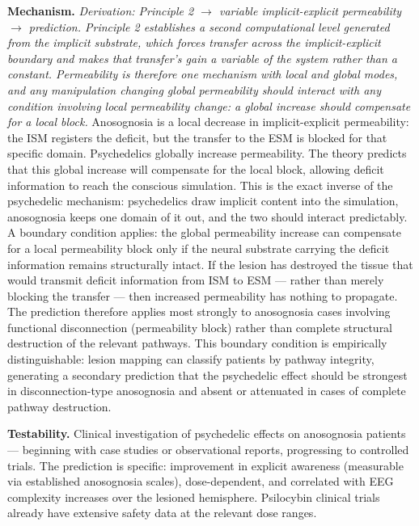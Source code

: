 \documentclass[12pt]{article}
\begin{document}
\textbf{Mechanism.} \emph{Derivation: Principle 2 $\rightarrow$ variable implicit-explicit permeability $\rightarrow$ prediction. Principle 2 establishes a second computational level generated from the implicit substrate, which forces transfer across the implicit-explicit boundary and makes that transfer's gain a variable of the system rather than a constant. Permeability is therefore one mechanism with local and global modes, and any manipulation changing global permeability should interact with any condition involving local permeability change: a global increase should compensate for a local block.} Anosognosia is a local decrease in implicit-explicit permeability: the ISM registers the deficit, but the transfer to the ESM is blocked for that specific domain. Psychedelics globally increase permeability. The theory predicts that this global increase will compensate for the local block, allowing deficit information to reach the conscious simulation. This is the exact inverse of the psychedelic mechanism: psychedelics draw implicit content into the simulation, anosognosia keeps one domain of it out, and the two should interact predictably. A boundary condition applies: the global permeability increase can compensate for a local permeability block only if the neural substrate carrying the deficit information remains structurally intact. If the lesion has destroyed the tissue that would transmit deficit information from ISM to ESM --- rather than merely blocking the transfer --- then increased permeability has nothing to propagate. The prediction therefore applies most strongly to anosognosia cases involving functional disconnection (permeability block) rather than complete structural destruction of the relevant pathways. This boundary condition is empirically distinguishable: lesion mapping can classify patients by pathway integrity, generating a secondary prediction that the psychedelic effect should be strongest in disconnection-type anosognosia and absent or attenuated in cases of complete pathway destruction.

\textbf{Testability.} Clinical investigation of psychedelic effects on anosognosia patients --- beginning with case studies or observational reports, progressing to controlled trials. The prediction is specific: improvement in explicit awareness (measurable via established anosognosia scales), dose-dependent, and correlated with EEG complexity increases over the lesioned hemisphere. Psilocybin clinical trials already have extensive safety data at the relevant dose ranges.
\end{document}
